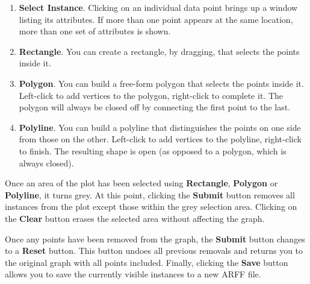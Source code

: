 \begin{enumerate}
\item \textbf{Select Instance}.
Clicking on an individual data point brings up a window listing its attributes.
If more than one point appears at the same location, more than one set of
attributes is shown.
\item \textbf{Rectangle}.
You can create a rectangle, by dragging, that selects the points inside it.
\item \textbf{Polygon}.
You can build a free-form polygon that selects the points inside it. Left-click
to add vertices to the polygon, right-click to complete it. The polygon will
always be closed off by connecting the first point to the last.
\item \textbf{Polyline}.
You can build a polyline that distinguishes the points on one side from those
on the other. Left-click to add vertices to the polyline, right-click to
finish. The resulting shape is open (as opposed to a polygon, which is
always closed).
\end{enumerate}

Once an area of the plot has been selected using \textbf{Rectangle},
\textbf{Polygon} or \textbf{Polyline}, it turns grey.  At this point, clicking
the \textbf{Submit} button removes all instances from the plot except those
within the grey selection area.  Clicking on the \textbf{Clear} button erases
the selected area without affecting the graph.

Once any points have been removed from the graph, the \textbf{Submit} button
changes to a \textbf{Reset} button.  This button undoes all previous removals
and returns you to the original graph with all points included.  Finally,
clicking the \textbf{Save} button allows you to save the currently visible
instances to a new ARFF file.
